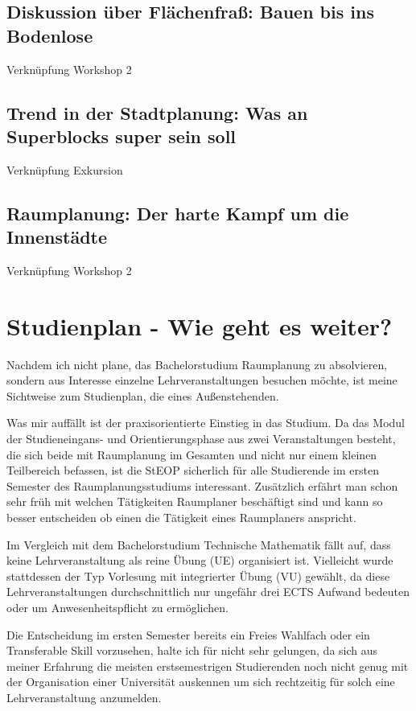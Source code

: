 \documentclass[]{article}
\begin{document}
\subsection{Diskussion über Flächenfraß: Bauen bis ins Bodenlose}
Verknüpfung Workshop 2

\subsection{Trend in der Stadtplanung: Was an Superblocks super sein soll}
Verknüpfung Exkursion

\subsection{Raumplanung: Der harte Kampf um die Innenstädte}
Verknüpfung Workshop 2

\section{Studienplan - Wie geht es weiter?}
Nachdem ich nicht plane, das Bachelorstudium Raumplanung zu absolvieren, sondern aus Interesse einzelne Lehrveranstaltungen besuchen möchte, ist meine Sichtweise zum Studienplan, die eines Außenstehenden.

Was mir auffällt ist der praxisorientierte Einstieg in das Studium. Da das Modul der Studieneingans- und Orientierungsphase aus zwei Veranstaltungen besteht, die sich beide mit Raumplanung im Gesamten und nicht nur einem kleinen Teilbereich befassen, ist die StEOP sicherlich für alle Studierende im ersten Semester des Raumplanungsstudiums interessant. Zusätzlich erfährt man schon sehr früh mit welchen Tätigkeiten Raumplaner beschäftigt sind und kann so besser entscheiden ob einen die Tätigkeit eines Raumplaners anspricht.

Im Vergleich mit dem Bachelorstudium Technische Mathematik fällt auf, dass keine Lehrveranstaltung als reine Übung (UE) organisiert ist. Vielleicht wurde stattdessen der Typ Vorlesung mit integrierter Übung (VU) gewählt, da diese Lehrveranstaltungen durchschnittlich nur ungefähr drei ECTS Aufwand bedeuten oder um Anwesenheitspflicht zu ermöglichen.

Die Entscheidung im ersten Semester bereits ein Freies Wahlfach oder ein Transferable Skill vorzusehen, halte ich für nicht sehr gelungen, da sich aus meiner Erfahrung die meisten erstsemestrigen Studierenden noch nicht genug mit der Organisation einer Universität auskennen um sich rechtzeitig für solch eine Lehrveranstaltung anzumelden.
\end{document}
